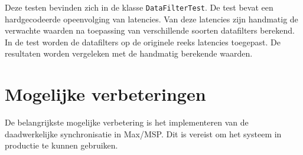 Deze testen bevinden zich in de klasse \texttt{DataFilterTest}. De test bevat een hardgecodeerde opeenvolging van latencies. Van deze latencies zijn handmatig de verwachte waarden na toepassing van verschillende soorten datafilters berekend. In de test worden de datafilters op de originele reeks latencies toegepast. De resultaten worden vergeleken met de handmatig berekende waarden.

\section{Mogelijke verbeteringen}

De belangrijkste mogelijke verbetering is het implementeren van de daadwerkelijke synchronisatie in Max/MSP. Dit is vereist om het systeem in productie te kunnen gebruiken.
